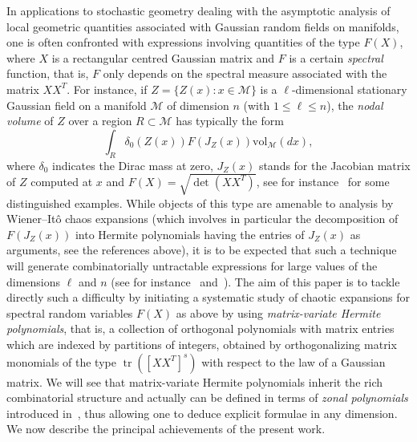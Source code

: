 \documentclass[AHL,Unicode,longabstracts,published]{cedram}
\DeclareMathOperator{\Tr}{tr}
\newcommand{\rvol}{\mathrm{vol}}
\newcommand{\clM}{\mathcal{M}}
\begin{document}
In applications to stochastic geometry dealing with the asymptotic analysis of local geometric quantities associated with Gaussian random fields on manifolds, one is often confronted with expressions involving quantities of the type $F(X)$, where $X$ is a rectangular centred Gaussian matrix and $F$ is a certain \emph{spectral} function, that is, $F$ only depends on the spectral measure associated with the matrix $XX^T$. For instance, if $Z=\{Z(x):x\in \clM\}$ is a $\ell$-dimensional stationary Gaussian field on a manifold $\clM$ of dimension $n$ (with $1\leq \ell \leq n$), the \emph{nodal volume} of $Z$ over a region $R \subset \clM$ has typically the form
\[
\int_{R} \delta_0(Z(x)) F(J_Z(x)) \rvol_{\clM}(dx),
\]
where $\delta_0$ indicates the Dirac mass at zero, $J_Z(x)$ stands for the Jacobian matrix of $Z$ computed at $x$ and $F(X) = \sqrt{\det{(XX^T)}}$, see for instance~\cite{MPRW16,MRW17,NPR17,Not20,
Wig10} for some distinguished examples. While objects of this type are amenable to analysis by Wiener--Itô chaos expansions (which involves in particular the decomposition of $F(J_Z(x))$ into Hermite polynomials having the entries of $J_Z(x)$ as arguments, see the references above), it is to be expected that such a technique will generate combinatorially untractable expressions for large values of the dimensions $\ell$ and $n$ (see for instance~\cite{DEL19} and~\cite{Not20}). The aim of this paper is to tackle directly such a difficulty by initiating a systematic study of chaotic expansions for spectral random variables $F(X)$ as above by using \emph{matrix-variate Hermite polynomials}, that is, a collection of orthogonal polynomials with matrix entries which are indexed by partitions of integers, obtained by orthogonalizing matrix monomials of the type $\Tr([XX^T]^s)$ with respect to the law of a Gaussian matrix. We will see that matrix-variate Hermite polynomials inherit the rich combinatorial structure and actually can be defined in terms of \emph{zonal polynomials} introduced in~\cite{J61}, thus allowing one to deduce explicit formulae in any dimension. We now describe the principal achievements of the present work.
\end{document}
